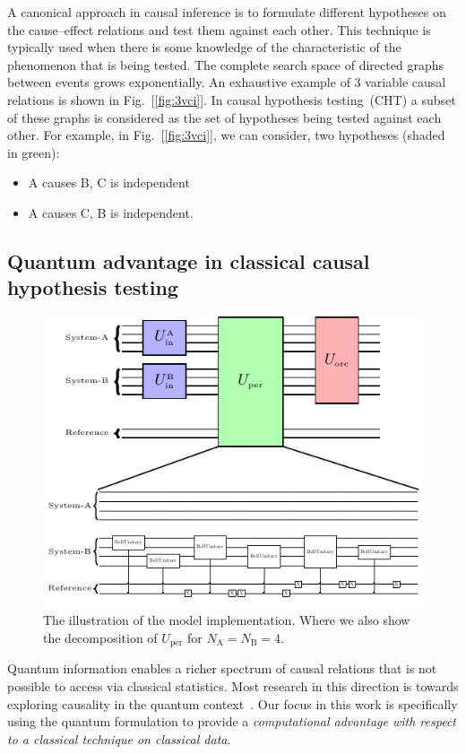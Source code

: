 \documentclass[%
 aps,
 jmp,%
 amsmath,amssymb,
 reprint,%
]{revtex4-2}
\begin{document}
A canonical approach in causal inference is to formulate different hypotheses on the cause–effect relations and test them against each other.
This technique is typically used when there is some knowledge of the characteristic of the phenomenon that is being tested.
The complete search space of directed graphs between events grows exponentially.
An exhaustive example of 3 variable causal relations is shown in Fig.~[\ref{fig:3vci}].
In causal hypothesis testing~(CHT) a subset of these graphs is considered as the set of hypotheses being tested against each other.
For example, in Fig.~[\ref{fig:3vci}], we can consider, two hypotheses (shaded in green):
\begin{itemize}[nolistsep,noitemsep]
	\item A causes B, C is independent
	\item A causes C, B is independent.
\end{itemize}

\subsection{Quantum advantage in classical causal hypothesis testing}
\begin{figure}[t!]
	\centering
	\includegraphics[width = 0.7\linewidth]{bortoni.pdf}
	\caption{The illustration of the model implementation. Where we also show the decomposition of $U_\textrm{per}$ for $ N_\textrm{A} = N_\textrm{B} = 4$.}
	\label{fig:perm-circuit}
\end{figure}
Quantum information enables a richer spectrum of causal relations that is not possible to access via classical statistics.
Most research in this direction is towards exploring causality in the quantum context~\cite{costa2016quantum,giarmatzi2019quantum,javidian2021quantum,bai2021quantum,bai2020efficient,bavaresco2021strict}.
Our focus in this work is specifically using the quantum formulation to provide a \textit{computational advantage with respect to a classical technique on classical data}.
\end{document}
